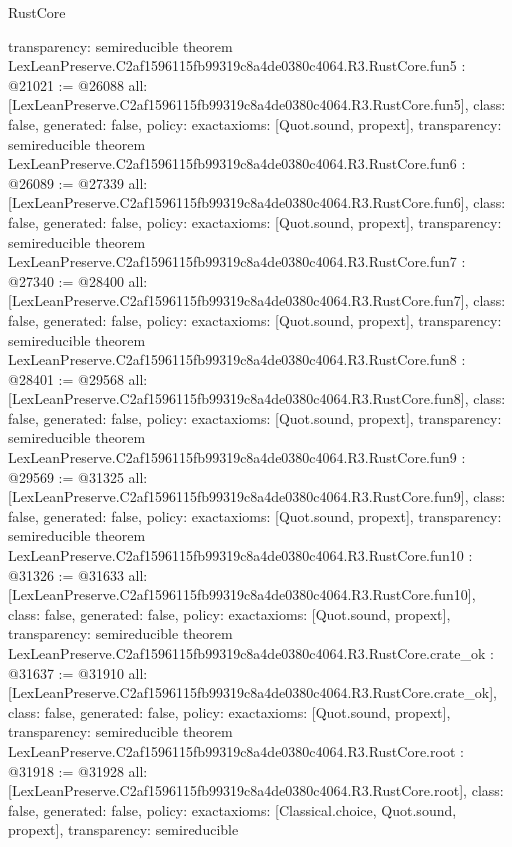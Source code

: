 \begin{lexlean}{RustCore}
\begin{coremodule}
{  transparency: semireducible
}
theorem LexLeanPreserve.C2af1596115fb99319c8a4de0380c4064.R3.RustCore.fun5 : @21021 := @26088 {
  all: [LexLeanPreserve.C2af1596115fb99319c8a4de0380c4064.R3.RustCore.fun5],
  class: false,
  generated: false,
  policy: exact{axioms: [Quot.sound, propext]},
  transparency: semireducible
}
theorem LexLeanPreserve.C2af1596115fb99319c8a4de0380c4064.R3.RustCore.fun6 : @26089 := @27339 {
  all: [LexLeanPreserve.C2af1596115fb99319c8a4de0380c4064.R3.RustCore.fun6],
  class: false,
  generated: false,
  policy: exact{axioms: [Quot.sound, propext]},
  transparency: semireducible
}
theorem LexLeanPreserve.C2af1596115fb99319c8a4de0380c4064.R3.RustCore.fun7 : @27340 := @28400 {
  all: [LexLeanPreserve.C2af1596115fb99319c8a4de0380c4064.R3.RustCore.fun7],
  class: false,
  generated: false,
  policy: exact{axioms: [Quot.sound, propext]},
  transparency: semireducible
}
theorem LexLeanPreserve.C2af1596115fb99319c8a4de0380c4064.R3.RustCore.fun8 : @28401 := @29568 {
  all: [LexLeanPreserve.C2af1596115fb99319c8a4de0380c4064.R3.RustCore.fun8],
  class: false,
  generated: false,
  policy: exact{axioms: [Quot.sound, propext]},
  transparency: semireducible
}
theorem LexLeanPreserve.C2af1596115fb99319c8a4de0380c4064.R3.RustCore.fun9 : @29569 := @31325 {
  all: [LexLeanPreserve.C2af1596115fb99319c8a4de0380c4064.R3.RustCore.fun9],
  class: false,
  generated: false,
  policy: exact{axioms: [Quot.sound, propext]},
  transparency: semireducible
}
theorem LexLeanPreserve.C2af1596115fb99319c8a4de0380c4064.R3.RustCore.fun10 : @31326 := @31633 {
  all: [LexLeanPreserve.C2af1596115fb99319c8a4de0380c4064.R3.RustCore.fun10],
  class: false,
  generated: false,
  policy: exact{axioms: [Quot.sound, propext]},
  transparency: semireducible
}
theorem LexLeanPreserve.C2af1596115fb99319c8a4de0380c4064.R3.RustCore.crate_ok : @31637 := @31910 {
  all: [LexLeanPreserve.C2af1596115fb99319c8a4de0380c4064.R3.RustCore.crate_ok],
  class: false,
  generated: false,
  policy: exact{axioms: [Quot.sound, propext]},
  transparency: semireducible
}
theorem LexLeanPreserve.C2af1596115fb99319c8a4de0380c4064.R3.RustCore.root : @31918 := @31928 {
  all: [LexLeanPreserve.C2af1596115fb99319c8a4de0380c4064.R3.RustCore.root],
  class: false,
  generated: false,
  policy: exact{axioms: [Classical.choice, Quot.sound, propext]},
  transparency: semireducible
}


\end{coremodule}
\end{lexlean}
